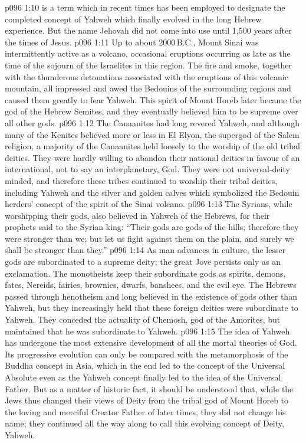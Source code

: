 \vs p096 1:10 \pc {} is a term which in recent times has been employed to designate the completed concept of Yahweh which finally evolved in the long Hebrew experience. But the name Jehovah did not come into use until 1,500 years after the times of Jesus.
\vs p096 1:11 \pc Up to about 2000\,B.C., Mount Sinai was intermittently active as a volcano, occasional eruptions occurring as late as the time of the sojourn of the Israelites in this region. The fire and smoke, together with the thunderous detonations associated with the eruptions of this volcanic mountain, all impressed and awed the Bedouins of the surrounding regions and caused them greatly to fear Yahweh. This spirit of Mount Horeb later became the god of the Hebrew Semites, and they eventually believed him to be supreme over all other gods.
\vs p096 1:12 The Canaanites had long revered Yahweh, and although many of the Kenites believed more or less in El Elyon, the supergod of the Salem religion, a majority of the Canaanites held loosely to the worship of the old tribal deities. They were hardly willing to abandon their national deities in favour of an international, not to say an interplanetary, God. They were not universal\hyp{}deity minded, and therefore these tribes continued to worship their tribal deities, including Yahweh and the silver and golden calves which symbolized the Bedouin herders’ concept of the spirit of the Sinai volcano.
\vs p096 1:13 The Syrians, while worshipping their gods, also believed in Yahweh of the Hebrews, for their prophets said to the Syrian king: “Their gods are gods of the hills; therefore they were stronger than we; but let us fight against them on the plain, and surely we shall be stronger than they.”
\vs p096 1:14 As man advances in culture, the lesser gods are subordinated to a supreme deity; the great Jove persists only as an exclamation. The monotheists keep their subordinate gods as spirits, demons, fates, Nereids, fairies, brownies, dwarfs, banshees, and the evil eye. The Hebrews passed through henotheism and long believed in the existence of gods other than Yahweh, but they increasingly held that these foreign deities were subordinate to Yahweh. They conceded the actuality of Chemosh, god of the Amorites, but maintained that he was subordinate to Yahweh.
\vs p096 1:15 The idea of Yahweh has undergone the most extensive development of all the mortal theories of God. Its progressive evolution can only be compared with the metamorphosis of the Buddha concept in Asia, which in the end led to the concept of the Universal Absolute even as the Yahweh concept finally led to the idea of the Universal Father. But as a matter of historic fact, it should be understood that, while the Jews thus changed their views of Deity from the tribal god of Mount Horeb to the loving and merciful Creator Father of later times, they did not change his name; they continued all the way along to call this evolving concept of Deity, Yahweh.
